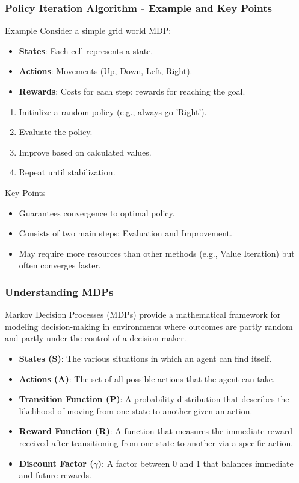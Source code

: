 \documentclass{beamer}
\begin{document}
\begin{frame}[fragile]
    \frametitle{Policy Iteration Algorithm - Example and Key Points}
    \begin{block}{Example}
        Consider a simple grid world MDP:
        \begin{itemize}
            \item \textbf{States}: Each cell represents a state.
            \item \textbf{Actions}: Movements (Up, Down, Left, Right).
            \item \textbf{Rewards}: Costs for each step; rewards for reaching the goal.
        \end{itemize}
        \begin{enumerate}
            \item Initialize a random policy (e.g., always go 'Right').
            \item Evaluate the policy.
            \item Improve based on calculated values.
            \item Repeat until stabilization.
        \end{enumerate}
    \end{block}

    \begin{block}{Key Points}
        \begin{itemize}
            \item Guarantees convergence to optimal policy.
            \item Consists of two main steps: Evaluation and Improvement.
            \item May require more resources than other methods (e.g., Value Iteration) but often converges faster.
        \end{itemize}
    \end{block}
\end{frame}

\begin{frame}[fragile]
    \frametitle{Understanding MDPs}
    Markov Decision Processes (MDPs) provide a mathematical framework for modeling decision-making in environments where outcomes are partly random and partly under the control of a decision-maker. 
    \begin{itemize}
        \item \textbf{States (S)}: The various situations in which an agent can find itself.
        \item \textbf{Actions (A)}: The set of all possible actions that the agent can take.
        \item \textbf{Transition Function (P)}: A probability distribution that describes the likelihood of moving from one state to another given an action.
        \item \textbf{Reward Function (R)}: A function that measures the immediate reward received after transitioning from one state to another via a specific action.
        \item \textbf{Discount Factor ($\gamma$)}: A factor between 0 and 1 that balances immediate and future rewards.
    \end{itemize}
\end{frame}
\end{document}
